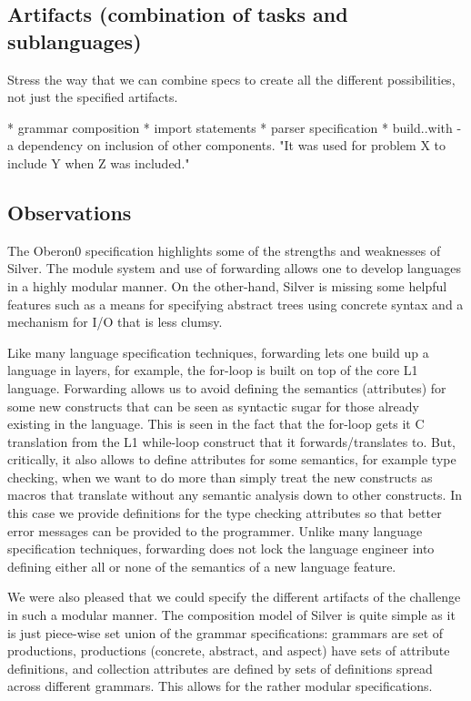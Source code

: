 \subsection{Artifacts (combination of tasks and sublanguages)}
\label{silver:sec:artifacts}

Stress the way that we can combine specs to create all the different
possibilities, not just the specified artifacts.

* grammar composition
* import statements
* parser specification
* build..with - a dependency on inclusion of other components.
  "It was used for problem X to include Y when Z was included."

\subsection{Observations}
\label{silver:sec:observations}

The Oberon0 specification highlights some of the strengths and
weaknesses of Silver.   The module system and use of forwarding allows
one to develop languages in a highly modular manner.   On the
other-hand, Silver is missing some helpful features such as a means for
specifying abstract trees using concrete syntax and a mechanism for
I/O that is less clumsy.

Like many language specification techniques, forwarding lets one build
up a language in layers, for example, the for-loop is built on top of
the core L1 language.  Forwarding allows us to avoid defining the
semantics (attributes) for some new constructs that can be seen as
syntactic sugar for those already existing in the language.  This is
seen in the fact that the for-loop gets it C translation from the L1
while-loop construct that it forwards/translates to.  But,
critically, it also allows to define attributes for some semantics,
for example type checking, when we want to do more than simply treat
the new constructs as macros that translate without any semantic
analysis down to other constructs.  In this case we provide
definitions for the type checking attributes so that better error
messages can be provided to the programmer.
%
Unlike many language specification techniques, forwarding does not
lock the language engineer into defining either all or none of the
semantics of a new language feature.

We were also pleased that we could specify the different artifacts of
the challenge in such a modular manner.  The composition model of
Silver is quite simple as it is just piece-wise set union of the
grammar specifications: grammars are set of productions, productions
(concrete, abstract, and aspect) have sets of attribute definitions,
and collection attributes are defined by sets of definitions spread
across different grammars.  This allows for the rather modular
specifications. 


